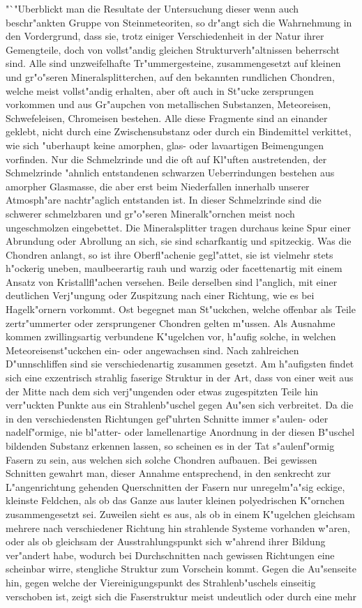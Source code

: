 \documentclass[a4paper, 11pt, oneside]{article}
\begin{document}
"`"Uberblickt man die Resultate der Untersuchung dieser wenn auch beschr"ankten Gruppe von Steinmeteoriten, so dr"angt sich die Wahrnehmung in den Vordergrund, dass sie, trotz einiger Verschiedenheit in der Natur ihrer Gemengteile, doch von vollst"andig gleichen Strukturverh"altnissen beherrscht sind. Alle sind unzweifelhafte Tr"ummergesteine, zusammengesetzt auf kleinen und gr"o"seren Mineralsplitterchen, auf den bekannten rundlichen Chondren, welche meist vollst"andig erhalten, aber oft auch in St"ucke zersprungen vorkommen und aus Gr"aupchen von metallischen Substanzen, Meteoreisen, Schwefeleisen, Chromeisen bestehen. Alle diese Fragmente sind an einander geklebt, nicht durch eine Zwischensubstanz oder durch ein Bindemittel verkittet, wie sich "uberhaupt keine amorphen, glas- oder lavaartigen Beimengungen vorfinden. Nur die Schmelzrinde und die oft auf Kl"uften austretenden, der Schmelzrinde "ahnlich entstandenen schwarzen Ueberrindungen bestehen aus amorpher Glasmasse, die aber erst beim Niederfallen innerhalb unserer Atmosph"are nachtr"aglich entstanden ist. In dieser Schmelzrinde sind die schwerer schmelzbaren und gr"o"seren Mineralk"ornchen meist noch ungeschmolzen eingebettet. Die Mineralsplitter tragen durchaus keine Spur einer Abrundung oder Abrollung an sich, sie sind scharfkantig und spitzeckig. Was die Chondren anlangt, so ist ihre Oberfl"achenie gegl"attet, sie ist vielmehr stets h"ockerig uneben, maulbeerartig rauh und warzig oder facettenartig mit einem Ansatz von Kristallfl"achen versehen. Beile derselben sind l"anglich, mit einer deutlichen Verj"ungung oder Zuspitzung nach einer Richtung, wie es bei Hagelk"ornern vorkommt. Ost begegnet man St"uckchen, welche offenbar als Teile zertr"ummerter oder zersprungener Chondren gelten m"ussen. Als Ausnahme kommen zwillingsartig verbundene K"ugelchen vor, h"aufig solche, in welchen Meteoreisenst"uckchen ein- oder angewachsen sind. Nach zahlreichen D"unnschliffen sind sie verschiedenartig zusammen gesetzt. Am h"aufigsten findet sich eine exzentrisch strahlig faserige Struktur in der Art, dass von einer weit aus der Mitte nach dem sich verj"ungenden oder etwas zugespitzten Teile hin verr"uckten Punkte aus ein Strahlenb"uschel gegen Au"sen sich verbreitet. Da die in den verschiedensten Richtungen gef"uhrten Schnitte immer s"aulen- oder nadelf"ormige, nie bl"atter- oder lamellenartige Anordnung in der diesen B"uschel bildenden Substanz erkennen lassen, so scheinen es in der Tat s"aulenf"ormig Fasern zu sein, aus welchen sich solche Chondren aufbauen. Bei gewissen Schnitten gewahrt man, dieser Annahme entsprechend, in den senkrecht zur L"angenrichtung gehenden Querschnitten der Fasern nur unregelm"a"sig eckige, kleinste Feldchen, als ob das Ganze aus lauter kleinen polyedrischen K"ornchen zusammengesetzt sei. Zuweilen sieht es aus, als ob in einem K"ugelchen gleichsam mehrere nach verschiedener Richtung hin strahlende Systeme vorhanden w"aren, oder als ob gleichsam der Ausstrahlungspunkt sich w"ahrend ihrer Bildung ver"andert habe, wodurch bei Durchschnitten nach gewissen Richtungen eine scheinbar wirre, stengliche Struktur zum Vorschein kommt. Gegen die Au"senseite hin, gegen welche der Viereinigungspunkt des Strahlenb"uschels einseitig verschoben ist, zeigt sich die Faserstruktur meist undeutlich oder durch eine mehr 
\end{document}

